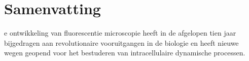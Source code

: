 %
%
\noquote
{}
\normalsize
\chpos{22mm}{12mm}
\chapter*{Samenvatting}

e ontwikkeling van fluorescentie microscopie
heeft in de afgelopen tien jaar bijgedragen aan revolutionaire vooruitgangen in de biologie
en heeft nieuwe wegen geopend voor het bestuderen van
intracellulaire dynamische processen. 




